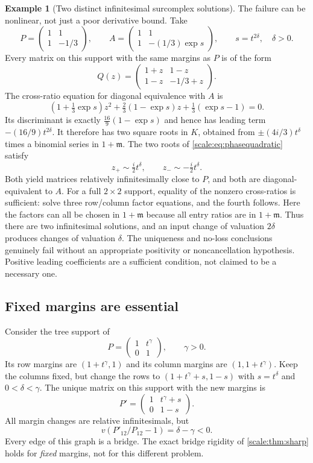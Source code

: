\documentclass[11pt,a4paper]{article}
\numberwithin{equation}{section}
\theoremstyle{definition}
\newtheorem{example}[theorem]{Example}
\newcommand{\mm}{\mathfrak m}
\begin{document}
\begin{example}[Two distinct infinitesimal surcomplex solutions]
\label{scale:ex:phasebranches}
The failure can be nonlinear, not just a poor derivative bound.
Take
\[
 P=\begin{pmatrix}1&1\\1&-1/3\end{pmatrix},\qquad
 A=\begin{pmatrix}1&1\\1&-(1/3)\exp s\end{pmatrix},
 \qquad s=t^{2\delta},\quad\delta>0.
\]
Every matrix on this support with the same margins as $P$ is of the
form
\[
 Q(z)=\begin{pmatrix}1+z&1-z\\1-z&-1/3+z\end{pmatrix}.
\]
The cross-ratio equation for diagonal equivalence with $A$ is
\begin{equation}\label{scale:eq:phasequadratic}
 (1+\tfrac13\exp s)z^2
 +\tfrac23(1-\exp s)z
 +\tfrac13(\exp s-1)=0.
\end{equation}
Its discriminant is exactly $\tfrac{16}{9}(1-\exp s)$ and hence has
leading term $-(16/9)t^{2\delta}$.
It therefore has two square roots in $K$, obtained from
$\pm(4i/3)t^\delta$ times a binomial series in $1+\mm$.
The two roots of \eqref{scale:eq:phasequadratic} satisfy
\[
 z_+\sim\tfrac{i}{2}t^\delta,
 \qquad z_-\sim-\tfrac{i}{2}t^\delta.
\]
Both yield matrices relatively infinitesimally close to $P$, and
both are diagonal-equivalent to $A$. For a full $2\times2$ support,
equality of the nonzero cross-ratios is sufficient: solve three
row/column factor equations, and the fourth follows. Here the
factors can all be chosen in $1+\mm$ because all entry ratios are
in $1+\mm$.
Thus there are two infinitesimal solutions, and an input change of
valuation $2\delta$ produces changes of valuation $\delta$.
The uniqueness and no-loss conclusions genuinely fail without
an appropriate positivity or noncancellation hypothesis. Positive
leading coefficients are a sufficient condition, not claimed to
be a necessary one.
\end{example}

\subsection{Fixed margins are essential}
Consider the tree support of
\[
 P=\begin{pmatrix}1&t^\gamma\\0&1\end{pmatrix},\qquad\gamma>0.
\]
Its row margins are $(1+t^\gamma,1)$ and its column margins are
$(1,1+t^\gamma)$. Keep the columns fixed, but change the rows to
$(1+t^\gamma+s,1-s)$ with $s=t^\delta$ and $0<\delta<\gamma$.
The unique matrix on this support with the new margins is
\[
 P'=\begin{pmatrix}1&t^\gamma+s\\0&1-s\end{pmatrix}.
\]
All margin changes are relative infinitesimals, but
\[
 v(P'_{12}/P_{12}-1)=\delta-\gamma<0.
\]
Every edge of this graph is a bridge. The exact bridge rigidity
of \cref{scale:thm:sharp} holds for \emph{fixed} margins, not for
this different problem.
\end{document}
